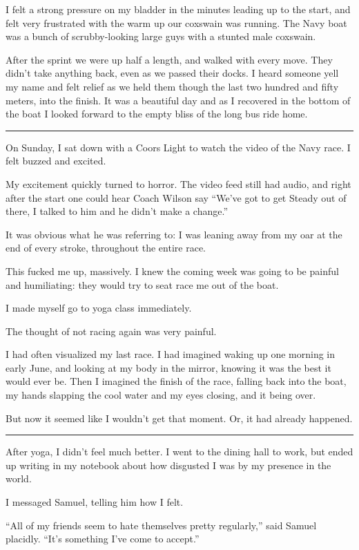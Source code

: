 I felt a strong pressure on my bladder in the minutes leading up to the start,
and felt very frustrated with the warm up our coxswain was running.  The Navy
boat was a bunch of scrubby-looking large guys with a stunted male coxswain.

After the sprint we were up half a length, and walked with every move.  They
didn't take anything back, even as we passed their docks.  I heard someone yell
my name and felt relief as we held them though the last two hundred and fifty
meters, into the finish.  It was a beautiful day and as I recovered in the
bottom of the boat I looked forward to the empty bliss of the long bus ride
home.

\plainfancybreak{12pt}{2}{* * *}

On Sunday, I sat down with a Coors Light to watch the video of the Navy race.  I
felt buzzed and excited. 

My excitement quickly turned to horror.  The video feed still had audio, and
right after the start one could hear Coach Wilson say ``We've got to get Steady
out of there, I talked to him and he didn't make a change.''  

It was obvious what he was referring to: I was leaning away from my oar at the
end of every stroke, throughout the entire race.

This fucked me up, massively.  I knew the coming week was going to be painful and
humiliating: they would try to seat race me out of the boat.

I made myself go to yoga class immediately.  

The thought of not racing again was very painful.  

I had often visualized my last race.  I had imagined waking up one morning in
early June, and looking at my body in the mirror, knowing it was the best it
would ever be.  Then I imagined the finish of the race, falling back into the
boat, my hands slapping the cool water and my eyes closing, and it being over.

But now it seemed like I wouldn't get that moment.  Or, it had already happened.

\plainfancybreak{12pt}{2}{* * *}

After yoga, I didn't feel much better.  I went to the dining hall to work, but
ended up writing in my notebook about how disgusted I was by my presence in the
world.

I messaged Samuel, telling him how I felt.

``All of my friends seem to hate themselves pretty regularly,'' said Samuel
placidly.  ``It's something I've come to accept.''

